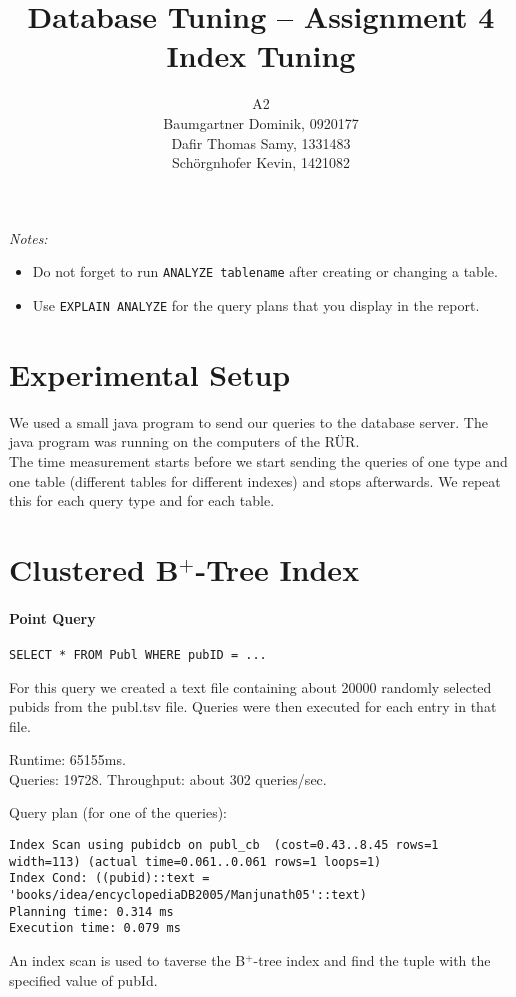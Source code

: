 \documentclass[11pt]{scrartcl}
\title{
  \textbf{\large Database Tuning -- Assignment 4}\\
  Index Tuning
}
\author{
	A2\\
	\large Baumgartner Dominik, 0920177 \\
	\large Dafir Thomas Samy, 1331483 \\
	\large Sch\"orgnhofer Kevin, 1421082
}
\begin{document}
\maketitle

\noindent
{\it Notes:}
\begin{itemize}\itemsep=0pt
\item Do not forget to run {\tt ANALYZE tablename} after creating or
  changing a table.
\item Use {\tt EXPLAIN ANALYZE} for the query plans that you display in the report.
\end{itemize}


\section{Experimental Setup}

We used a small java program to send our queries to the database server. The java program was running on the computers of the R\"UR.\\
The time measurement starts before we start sending the queries of one type and one table (different tables for different indexes) and stops afterwards. We repeat this for each query type and for each table.

\section{Clustered B$^+$-Tree Index}

\paragraph{Point Query}

{\small
\begin{verbatim}
SELECT * FROM Publ WHERE pubID = ...
\end{verbatim}
}

\noindent
For this query we created a text file containing about 20000 randomly selected pubids from the publ.tsv file. Queries were then executed for each entry in that file.

\smallskip\noindent
Runtime: 65155ms. \\
Queries: 19728.
Throughput: about 302 queries/sec.

\smallskip\noindent
Query plan (for one of the queries):
{\small
\begin{verbatim}
Index Scan using pubidcb on publ_cb  (cost=0.43..8.45 rows=1 width=113) (actual time=0.061..0.061 rows=1 loops=1)
Index Cond: ((pubid)::text = 'books/idea/encyclopediaDB2005/Manjunath05'::text)
Planning time: 0.314 ms
Execution time: 0.079 ms
\end{verbatim}
An index scan is used to taverse the B$^+$-tree index and find the tuple with the specified value of pubId.
}
\end{document}
